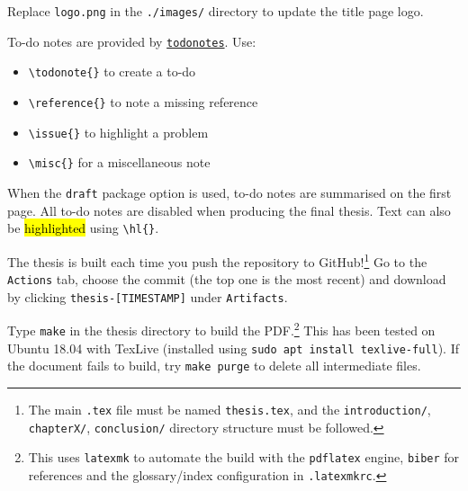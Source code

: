 
Replace \texttt{logo.png} in the \texttt{./images/} directory to update the title page logo.

\newpage
{}\label{sec:todonotes}

To-do notes are provided by \href{https://ctan.org/pkg/todonotes}{\texttt{todonotes}}. Use:
\begin{itemize}
  \item \verb|\todonote{}| to create a to-do
  \item \verb|\reference{}| to note a missing reference
  \item \verb|\issue{}| to highlight a problem
  \item \verb|\misc{}| for a miscellaneous note
\end{itemize}

When the \texttt{draft} package option is used, to-do notes are summarised on the first
page. All to-do notes are disabled when producing the final thesis. Text can also be \hl{highlighted} using \verb|\hl{}|. 



The thesis is built each time you push the repository to GitHub!\footnote{The main \texttt{.tex}
file must be named \texttt{thesis.tex}, and the \texttt{introduction/}, \texttt{chapterX/},
\texttt{conclusion/} directory structure must be followed.} Go to the \texttt{Actions}
tab, choose the commit (the top one is the most recent) and download by clicking \texttt{thesis-[TIMESTAMP]}
under \texttt{Artifacts}.


Type \texttt{make} in the thesis directory to build the PDF.\footnote{This uses \texttt{latexmk}
to automate the build with the \texttt{pdflatex} engine, \texttt{biber} for references and
the glossary/index configuration in \texttt{.latexmkrc}.} This has been tested on  Ubuntu
18.04 with TexLive (installed using \texttt{sudo apt install texlive-full}). If the document
fails to build, try \texttt{make purge} to delete all intermediate files.

